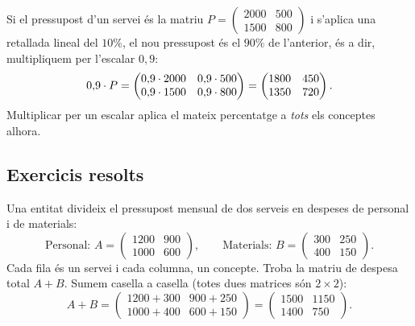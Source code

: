 \begin{exemple}
Si el pressupost d'un servei és la matriu $P=\begin{pmatrix} 2000 & 500 \\ 1500 & 800 \end{pmatrix}$
i s'aplica una retallada lineal del $10\%$, el nou pressupost és el $90\%$ de
l'anterior, és a dir, multipliquem per l'escalar $0{,}9$:
\[
0{,}9\cdot P=\begin{pmatrix} 0{,}9\cdot 2000 & 0{,}9\cdot 500 \\ 0{,}9\cdot 1500 & 0{,}9\cdot 800 \end{pmatrix}
            =\begin{pmatrix} 1800 & 450 \\ 1350 & 720 \end{pmatrix}.
\]
Multiplicar per un escalar aplica el mateix percentatge a \emph{tots} els conceptes alhora.
\end{exemple}

\subsection{Exercicis resolts}

\begin{exresolt}
Una entitat divideix el pressupost mensual de dos serveis en despeses de
personal i de materials:
\[
\text{Personal: } A=\begin{pmatrix} 1200 & 900 \\ 1000 & 600 \end{pmatrix},\qquad
\text{Materials: } B=\begin{pmatrix} 300 & 250 \\ 400 & 150 \end{pmatrix}.
\]
Cada fila és un servei i cada columna, un concepte. Troba la matriu de despesa
total $A+B$.
\solucio
Sumem casella a casella (totes dues matrices són $2\times 2$):
\[
A+B=\begin{pmatrix} 1200+300 & 900+250 \\ 1000+400 & 600+150 \end{pmatrix}
    =\begin{pmatrix} 1500 & 1150 \\ 1400 & 750 \end{pmatrix}.
\]
\end{exresolt}

